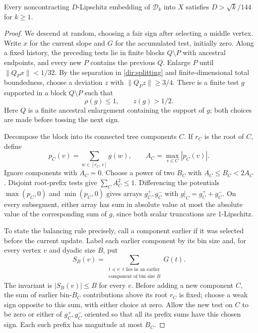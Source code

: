 \begin{proposition}\label{dir:bin-descent}
Every noncontracting $D$-Lipschitz embedding of $\mathcal D_k$ into $X$
satisfies $D>\sqrt{k}/144$ for $k\ge1$.
\end{proposition}
\begin{proof}
We descend at random, choosing a fair sign after selecting a middle
vertex.  Write $x$ for the current slope and $G$ for the accumulated
test, initially zero.  Along a fixed history, the preceding tests lie
in finite blocks $Q\setminus P$ with ancestral endpoints, and every
new $P$ contains the previous $Q$.  Enlarge $P$ until
$\|Q_Px\|<1/32$.  By the separation in \eqref{dir:splitting} and
finite-dimensional total boundedness, choose a deviation $z$ with
$\|Q_Pz\|\ge3/4$.  There is a finite test $g$ supported in a block
$Q\setminus P$ such that
\begin{equation}\label{dir:bin-witness}
 \rho(g)\le1,\qquad z(g)>1/2.
\end{equation}
Here $Q$ is a finite ancestral enlargement containing the support of
$g$; both choices are made before tossing the next sign.

Decompose the block into its connected tree components $C$.  If $r_C$
is the root of $C$, define
\[
 p_C(v)=\sum_{w\in[r_C,v]}g(w),\qquad
 A_C=\max_{v\in C}|p_C(v)|.
\]
Ignore components with $A_C=0$.  Choose a power of two $B_C$ with
$A_C\le B_C<2A_C$.  Disjoint root-prefix tests give
$\sum_CA_C^2\le1$.  Differencing the potentials
$\max(p_C,0)$ and $\min(p_C,0)$ gives arrays $g_C^+,g_C^-$ with
$g|_C=g_C^++g_C^-$.  On every subsegment, either array has sum in
absolute value at most the absolute value of the corresponding sum of
$g$, since both scalar truncations are 1-Lipschitz.

To state the balancing rule precisely, call a component earlier if it
was selected before the current update. Label each earlier component by
its bin size and, for every vertex $v$ and dyadic size $B$, put
\[
 S_B(v)=\sum_{\substack{t\preceq v:\ t\text{ lies in an earlier}\\
                              \text{component of bin size }B}}G(t).
\]
The invariant is $|S_B(v)|\le B$ for every $v$. Before adding a new
component $C$, the sum of earlier bin-$B_C$ contributions above its root
$r_C$ is fixed; choose a weak sign opposite to this sum, with either
choice at zero. Allow the new test on $C$ to be zero or either of
$g_C^+,g_C^-$ oriented so that all its prefix sums have this chosen sign.
Each such prefix has magnitude at most $B_C$.


\end{proof}
